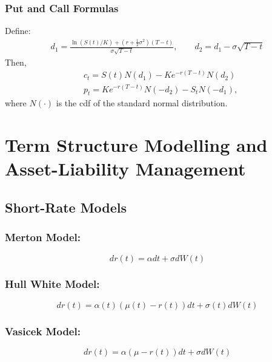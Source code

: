 \documentclass[11pt]{article}
\begin{document}
	\subsubsection{Put and Call Formulas}
	Define:
	\begin{align*}
		d_1 = \frac{\ln\left(S(t)/ K\right) +\left(r + \frac{1}{2}\sigma^2\right)(T - t)}{\sigma\sqrt{T - t}},\qquad d_2 
		= d_1 - \sigma\sqrt{T - t}
	\end{align*}
	Then,
	\begin{align*}
		& c_t = S(t)N(d_1) - Ke^{-r(T - t)}N(d_2)\\[4pt]
		& p_t = Ke^{-r(T - t)}N(-d_2) - S_t N(-d_1),
	\end{align*}
	where \( N(\cdot) \) is the cdf of the standard normal distribution.
	\section{Term Structure Modelling and Asset-Liability Management}
	\subsection{Short-Rate Models}
	\subsubsection{Merton Model:}
	\[	
		dr(t) = \alpha dt + \sigma dW(t)
			\]

	\subsubsection{Hull White Model:}
	\[	
		dr(t) = \alpha(t)(\mu(t) - r(t))dt + \sigma(t)dW(t)
		\]
	
	\subsubsection{Vasicek Model:}
	\[	dr(t) = \alpha (\mu - r(t)) dt + \sigma dW(t)
		\]
\end{document}
